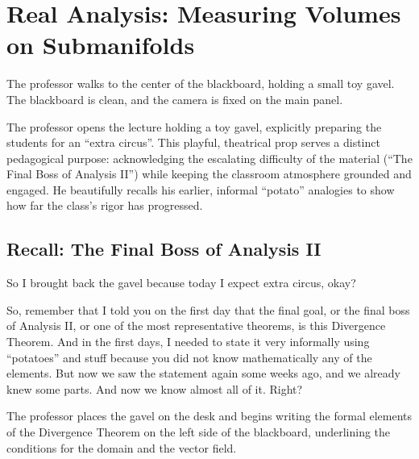 \chapter{Real Analysis: Measuring Volumes on Submanifolds}

\begin{metanote}
The professor walks to the center of the blackboard, holding a small toy gavel. The blackboard is clean, and the camera is fixed on the main panel.
\end{metanote}

\begin{didacticinsight}
The professor opens the lecture holding a toy gavel, explicitly preparing the students for an ``extra circus''. This playful, theatrical prop serves a distinct pedagogical purpose: acknowledging the escalating difficulty of the material (``The Final Boss of Analysis II'') while keeping the classroom atmosphere grounded and engaged. He beautifully recalls his earlier, informal ``potato'' analogies to show how far the class's rigor has progressed.
\end{didacticinsight}


\section{Recall: The Final Boss of Analysis II}

\begin{spokenclean}[00:00:00 - 00:00:58]
So I brought back the gavel because today I expect extra circus, okay? 

So, remember that I told you on the first day that the final goal, or the final boss of Analysis II, or one of the most representative theorems, is this Divergence Theorem. And in the first days, I needed to state it very informally using ``potatoes'' and stuff because you did not know mathematically any of the elements. But now we saw the statement again some weeks ago, and we already knew some parts. And now we know almost all of it. Right? 
\end{spokenclean}

\begin{nicebox}
The professor places the gavel on the desk and begins writing the formal elements of the Divergence Theorem on the left side of the blackboard, underlining the conditions for the domain and the vector field.
\end{nicebox}

